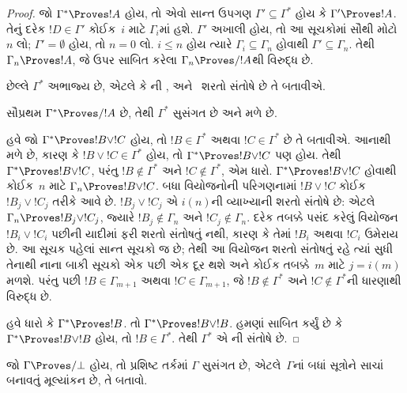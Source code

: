 \begin{proof}
  જો $\Gamma^* \Proves !A$ હોય, તો એવો સાન્ત ઉપગણ
  $\Gamma' \subseteq \Gamma^*$ હોય
  કે $\Gamma' \Proves !A$. તેનું દરેક
  $!D \in \Gamma'$ કોઈક~$i$ માટે $\Gamma_i$માં હશે.
  $\Gamma'$ અખાલી હોય, તો આ સૂચકોમાં સૌથી મોટો $n$ લો;
  $\Gamma'=\emptyset$ હોય, તો $n=0$ લો. $i \le n$ હોય ત્યારે
  $\Gamma_i \subseteq \Gamma_n$ હોવાથી
  $\Gamma' \subseteq \Gamma_n$. તેથી
  $\Gamma_n \Proves !A$, જે ઉપર સાબિત કરેલા
  $\Gamma_n \Proves/ !A$થી વિરુદ્ધ છે.

  છેલ્લે $\Gamma^*$ અભાજ્ય છે, એટલે કે
  ની ,
   અને~
  શરતો સંતોષે છે તે બતાવીએ.

  સૌપ્રથમ $\Gamma^* \Proves/ !A$ છે, તેથી
  $\Gamma^*$ સુસંગત છે અને  મળે છે.

  હવે જો $\Gamma^* \Proves !B \lor !C$ હોય, તો
  $!B \in \Gamma^*$ અથવા $!C \in \Gamma^*$ છે તે
  બતાવીએ. આનાથી  મળે છે, કારણ કે
  $!B \lor !C \in \Gamma^*$ હોય, તો
  $\Gamma^* \Proves !B \lor !C$ પણ હોય. તેથી
  $\Gamma^* \Proves !B \lor !C$, પરંતુ
  $!B \notin \Gamma^*$ અને $!C \notin \Gamma^*$,
  એમ ધારો. $\Gamma^* \Proves !B \lor !C$
  હોવાથી કોઈક~$n$ માટે $\Gamma_n \Proves !B \lor !C$.
  બધા વિયોજનોની પરિગણનામાં $!B \lor !C$ કોઈક
  $!B_j \lor !C_j$ તરીકે આવે છે. $!B_j \lor !C_j$
  એ $i(n)$ની વ્યાખ્યાની શરતો સંતોષે છે: એટલે
  $\Gamma_n \Proves !B_j \lor !C_j$, જ્યારે
  $!B_j \notin \Gamma_n$ અને $!C_j \notin \Gamma_n$.
  દરેક તબક્કે પસંદ કરેલું વિયોજન~$!B_i \lor !C_i$
  પછીની યાદીમાં ફરી શરતો સંતોષતું નથી, કારણ કે
  તેમાં $!B_i$ અથવા $!C_i$ ઉમેરાય છે. આ સૂચક
  પહેલાં સાન્ત સૂચકો જ છે; તેથી આ વિયોજન શરતો સંતોષતું
  રહે ત્યાં સુધી તેનાથી નાના બાકી સૂચકો એક પછી એક
  દૂર થશે અને કોઈક તબક્કે~$m$ માટે $j = i(m)$ મળશે.
  પરંતુ પછી $!B \in \Gamma_{m+1}$ અથવા
  $!C \in \Gamma_{m+1}$, જે $!B \notin \Gamma^*$
  અને $!C \notin \Gamma^*$ની ધારણાથી વિરુદ્ધ છે.

  હવે ધારો કે $\Gamma^* \Proves !B$. તો
  $\Gamma^* \Proves !B \lor !B$. હમણાં સાબિત કર્યું
  છે કે $\Gamma^* \Proves !B \lor !B$ હોય, તો
  $!B \in \Gamma^*$. તેથી $\Gamma^*$ એ
  ની  સંતોષે છે.
\end{proof}

\begin{prob}
જો $\Gamma \Proves/ \bot$ હોય, તો પ્રશિષ્ટ તર્કમાં
$\Gamma$ સુસંગત છે, એટલે~$\Gamma$નાં બધાં સૂત્રોને
સાચાં બનાવતું મૂલ્યાંકન છે, તે બતાવો.
\end{prob}
\endgroup


